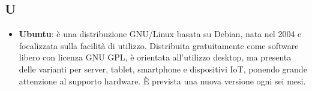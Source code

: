 \subsection{U}
\begin{itemize}
	\item \textbf{Ubuntu}: è una distribuzione GNU/Linux basata su Debian, nata nel 2004 e focalizzata sulla facilità di utilizzo. Distribuita gratuitamente come software libero con licenza GNU GPL, è orientata all'utilizzo desktop, ma presenta delle varianti per server, tablet, smartphone e dispositivi IoT, ponendo grande attenzione al supporto hardware. È prevista una nuova versione ogni sei mesi.
\end{itemize}